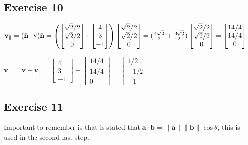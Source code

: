 \documentclass[11pt]{article}
\begin{document}
\subsection{Exercise 10}

$\textbf{v}_\|=(\hat{\textbf{n}}\cdot{}\textbf{v})\hat{\textbf{n}}=
\left(\begin{bmatrix}
\sqrt{2}/2 \\
\sqrt{2}/2 \\
0
\end{bmatrix}\cdot{}
\begin{bmatrix}
4 \\
3 \\
-1
\end{bmatrix}
\right)
\begin{bmatrix}
\sqrt{2}/2 \\
\sqrt{2}/2 \\
0
\end{bmatrix}= \\
(\frac{4\sqrt{2}}{2}+\frac{3\sqrt{2}}{2})
\begin{bmatrix}
\sqrt{2}/2 \\
\sqrt{2}/2 \\
0
\end{bmatrix}
=
\begin{bmatrix}
14/4 \\
14/4 \\
0
\end{bmatrix}$

$\textbf{v}_\bot=\textbf{v}-\textbf{v}_\|=
\begin{bmatrix}
4 \\
3 \\
-1
\end{bmatrix}-
\begin{bmatrix}
14/4 \\
14/4 \\
0
\end{bmatrix}=
\begin{bmatrix}
1/2 \\
-1/2 \\
-1
\end{bmatrix}
$

\subsection{Exercise 11}

Important to remember is that is stated that $\textbf{a}\cdot{}\textbf{b}=\|\textbf{a}\|\|\textbf{b}\|\cos\theta$, this is used in the second-last step.
\end{document}
